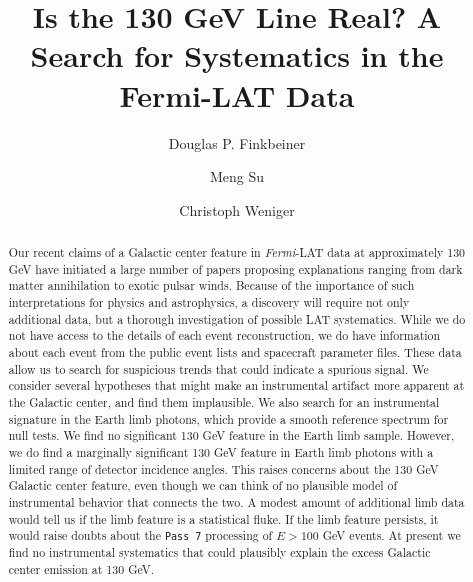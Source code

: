 \documentclass[aps,twocolumn,prd,superscriptaddress,showpacs,nofootinbib,fixfloat]{revtex4}
\newcommand{\Fermi}{{\slshape Fermi}}
\begin{document}
\title{Is the 130 GeV Line Real? 
  A Search for Systematics in the Fermi-LAT Data}

\author{Douglas P. Finkbeiner}

\author{Meng Su}

\author{Christoph Weniger}

\begin{abstract} Our recent claims of a Galactic center
  feature in \Fermi-LAT data at approximately 130 GeV have initiated a large
  number of papers proposing explanations
  ranging from dark matter annihilation to exotic pulsar
  winds.  Because of the importance of such interpretations
  for physics and astrophysics, a discovery will require not only additional
  data, but a thorough investigation of possible LAT
  systematics.  While we do not have access to the details
  of each event reconstruction, we do have information about
  each event from the public event lists and spacecraft
  parameter files.  These data allow us to search for
  suspicious trends that could indicate a spurious signal.
  We consider several hypotheses that might make an instrumental
  artifact more apparent at the Galactic center, and find them 
  implausible.  We also search for an instrumental signature in 
  the Earth limb photons, which provide a smooth
  reference spectrum for null tests.  We find no significant 
  130 GeV feature in the Earth limb sample.  However, we do 
  find a marginally significant 130 GeV feature in Earth 
  limb photons with a limited range of detector incidence angles.  
  This raises concerns about
  the 130 GeV Galactic center feature, even though we can
  think of no plausible model of instrumental behavior that
  connects the two.  A modest amount of additional limb data
  would tell us if the limb feature is a statistical fluke.
  If the limb feature persists, it would raise doubts
  about the \texttt{Pass 7} processing of $E > 100$ GeV events.  At present
  we find no instrumental systematics that could plausibly explain the excess
  Galactic center emission at 130 GeV. 
\end{abstract}
\end{document}

